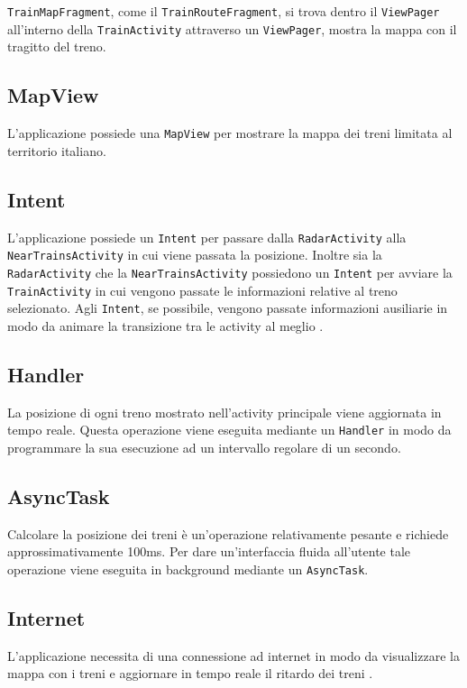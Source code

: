 \documentclass[a4paper,10pt]{article}
\begin{document}
    \medskip
    \noindent
    \texttt{TrainMapFragment}, come il \texttt{TrainRouteFragment}, si trova dentro il \texttt{ViewPager} all'interno della \texttt{TrainActivity} attraverso un \texttt{ViewPager}, mostra la mappa con il tragitto del treno.

  \subsection{MapView}
    L'applicazione possiede una \texttt{MapView} \cite{mapssdk} per mostrare la mappa dei treni limitata al territorio italiano.

  \subsection{Intent}
    L'applicazione possiede un \texttt{Intent} per passare dalla \texttt{RadarActivity} alla \texttt{NearTrainsActivity} in cui viene passata la posizione. Inoltre sia la \texttt{RadarActivity} che la \texttt{NearTrainsActivity} possiedono un \texttt{Intent} per avviare la \texttt{TrainActivity} in cui vengono passate le informazioni relative al treno selezionato. Agli \texttt{Intent}, se possibile, vengono passate informazioni ausiliarie in modo da animare la transizione tra le activity al meglio \cite{sharedelements}.

  \subsection{Handler}
    La posizione di ogni treno mostrato nell'activity principale viene aggiornata in tempo reale. Questa operazione viene eseguita mediante un \texttt{Handler} in modo da programmare la sua esecuzione ad un intervallo regolare di un secondo.

  \subsection{AsyncTask}
    Calcolare la posizione dei treni è un'operazione relativamente pesante e richiede approssimativamente 100ms. Per dare un'interfaccia fluida all'utente tale operazione viene eseguita in background mediante un \texttt{AsyncTask}.

  \subsection{Internet}
    L'applicazione necessita di una connessione ad internet in modo da visualizzare la mappa con i treni e aggiornare in tempo reale il ritardo dei treni \cite{tiapi}.
\end{document}
